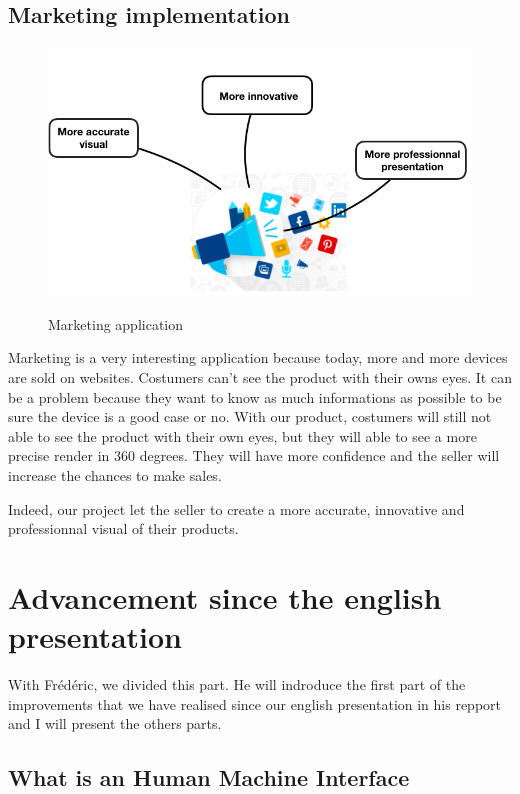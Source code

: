 \subsection{Marketing implementation}
\begin{figure}[h]
    \centering
    \includegraphics[scale=0.4]{img/marketing.png}\\%
    \caption{Marketing application}
    \label{fig:LogoTachyssema}
  \end{figure}

  Marketing is a very interesting application because today, more and more devices are sold on websites. Costumers can't see the product with their owns eyes. It can be a problem because they want to know as much informations as possible to be sure the device is a good case or no. 
  With our product, costumers will still not able to see the product with their own eyes, but they will able to see a more precise render in 360 degrees. They will have more confidence and the seller will increase the chances to make sales.  

  Indeed, our project let the seller to create a more accurate, innovative and professionnal visual of their products. 

\section {Advancement since the english presentation  } 

With Frédéric, we divided this part. He will indroduce the first part of the improvements that we have realised since our english presentation in his repport and I will present the others parts. 

\subsection {What is an Human Machine Interface } 

